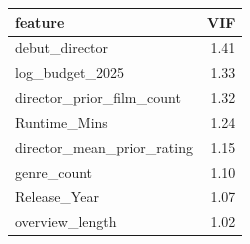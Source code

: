 \begin{tabular}{lr}
\toprule
feature & VIF \\
\midrule
debut\_director & 1.41 \\
log\_budget\_2025 & 1.33 \\
director\_prior\_film\_count & 1.32 \\
Runtime\_Mins & 1.24 \\
director\_mean\_prior\_rating & 1.15 \\
genre\_count & 1.10 \\
Release\_Year & 1.07 \\
overview\_length & 1.02 \\
\bottomrule
\end{tabular}
